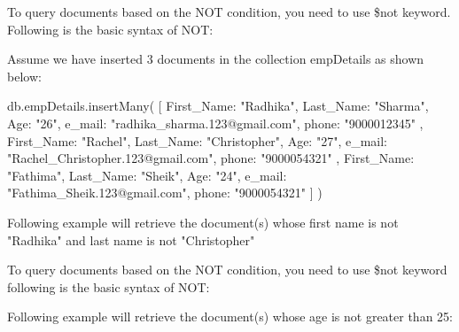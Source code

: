 \documentclass[12pt]{article}
\begin{document}
To query documents based on the NOT condition, you need to use \$not
keyword. Following is the basic syntax of NOT:


Assume we have inserted 3 documents in the collection empDetails as
shown below:

\begin{bashcode}
db.empDetails.insertMany(
    [
        {
            First_Name: "Radhika",
            Last_Name: "Sharma",
            Age: "26",
            e_mail: "radhika_sharma.123@gmail.com",
            phone: "9000012345"
        },
        {
            First_Name: "Rachel",
            Last_Name: "Christopher",
            Age: "27",
            e_mail: "Rachel_Christopher.123@gmail.com",
            phone: "9000054321"
        },
        {
            First_Name: "Fathima",
            Last_Name: "Sheik",
            Age: "24",
            e_mail: "Fathima_Sheik.123@gmail.com",
            phone: "9000054321"
        }
    ]
)
\end{bashcode}

Following example will retrieve the document(s) whose first name is not
"Radhika" and last name is not "Christopher"


To query documents based on the NOT condition, you need to use \$not
keyword following is the basic syntax of NOT:


Following example will retrieve the document(s) whose age is not greater
than 25:

\end{document}
